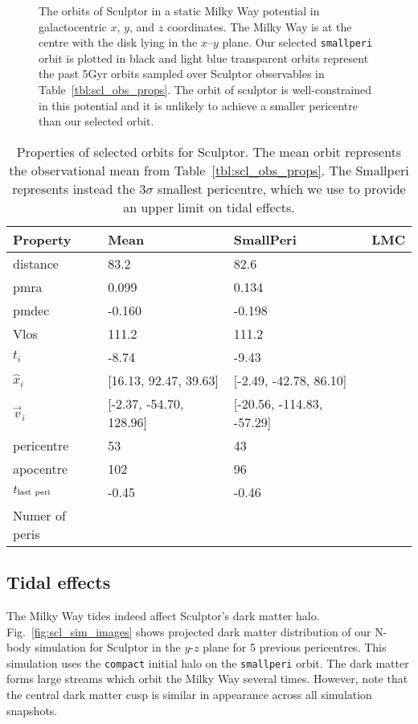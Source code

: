 \begin{figure}
\centering
{}
\caption[Sculptor Orbits]{The orbits of Sculptor in a static Milky Way
potential in galactocentric \(x\), \(y\), and \(z\) coordinates. The
Milky Way is at the centre with the disk lying in the \(x\)--\(y\)
plane. Our selected \texttt{smallperi} orbit is plotted in black and
light blue transparent orbits represent the past 5Gyr orbits sampled
over Sculptor observables in Table~\ref{tbl:scl_obs_props}. The orbit of
sculptor is well-constrained in this potential and it is unlikely to
achieve a smaller pericentre than our selected
orbit.}\label{fig:scl_orbits}
\end{figure}

\begin{table*}[t]
\centering
\caption[Sculptor Selected Orbits]{Properties of selected orbits for Sculptor. The mean orbit represents the observational mean from Table \ref{tbl:scl_obs_props}. The Smallperi represents instead the $3\sigma$ smallest pericentre, which we use to provide an upper limit on tidal effects. }
\label{tbl:scl_obrits}
\begin{tabular}{llll}
\toprule
Property & Mean & SmallPeri & LMC\\
\midrule
distance & 83.2 & 82.6 & \\
pmra & 0.099 & 0.134 & \\
pmdec & -0.160 & -0.198 & \\
Vlos & 111.2 & 111.2 & \\
$t_i$ & -8.74 & -9.43 & \\
$\hat{x}_{i}$ & [16.13, 92.47, 39.63] & [-2.49, -42.78, 86.10] & \\
$\vec{v}_i$ & [-2.37, -54.70, 128.96] & [-20.56, -114.83, -57.29] & \\
pericentre & 53 & 43 & \\
apocentre & 102 & 96 & \\
$t_{\rm last\ peri}$ & -0.45 & -0.46 & \\
Numer of peris &  &  & \\
\bottomrule
\end{tabular}
\end{table*}

\subsection{Tidal effects}\label{tidal-effects}

The Milky Way tides indeed affect Sculptor's dark matter halo.
Fig.~\ref{fig:scl_sim_images} shows projected dark matter distribution
of our N-body simulation for Sculptor in the \(y\)-\(z\) plane for 5
previous pericentres. This simulation uses the \texttt{compact} initial
halo on the \texttt{smallperi} orbit. The dark matter forms large
streams which orbit the Milky Way several times. However, note that the
central dark matter cusp is similar in appearance across all simulation
snapshots.


